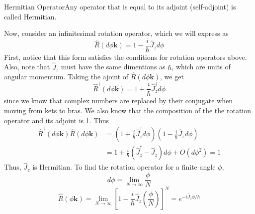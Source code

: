 \documentclass{report}
\newcommand{\dfn}[2]{\begin{Definition}[colbacktitle=red!75!black]{#1}{}#2\end{Definition}}
\begin{document}
\dfn{Hermitian Operator}{Any operator that is equal to its adjoint (self-adjoint) is called Hermitian.}
Now, consider an infinitesimal rotation operator, which we will express as
\[
\hat R(d\phi \mathbf k) = 1 - \frac{i}{\hbar}\hat J_z d\phi
\] 
First, notice that this form satisfies the conditions for rotation operators above. Also, note that \(\hat J_z\) must have the same dimentions as \(\hbar\), which are units of angular momentum. 
Taking the ajoint of \(\hat R(d\phi \mathbf k )\), we get
\[
\hat R^\dag(d \phi \mathbf k) = 1 + \frac{i}{\hbar}\hat J_z ^\dag d\phi
\] 
since we know that complex numbers are replaced by their conjugate when moving from kets to bras. We also know that the composition of the the rotation operator and its adjoint is 1. Thus
\begin{align*}
	\hat R^\dag (d \phi \mathbf k) \hat R (d \phi \mathbf k) &= \left(1 + \frac{i}{\hbar}\hat J_z^\dag d \phi \right) \left(1 - \frac{i}{\hbar} \hat J_z d\phi \right) \\
								 &=1 + \frac{i}{\hbar}\left(\hat J^\dag_z - \hat J_z \right) d \phi + O(d\phi ^2 ) = 1
\end{align*}
Thus, \(\hat J_z\) is Hermitian. To find the rotation operator for a finite angle \(\phi\), 
\[
d\phi = \lim_{N \to \infty}\frac{\phi}{N}
\] 
\[
	\hat R(\phi \mathbf k) = \lim_{N \to \infty}\left[ 1 - \frac{i}{\hbar}\hat J_z \left(\frac{\phi}{N}\right) \right]^N = e^{-i \hat J_z \phi/ \hbar}
\] 
\end{document}
